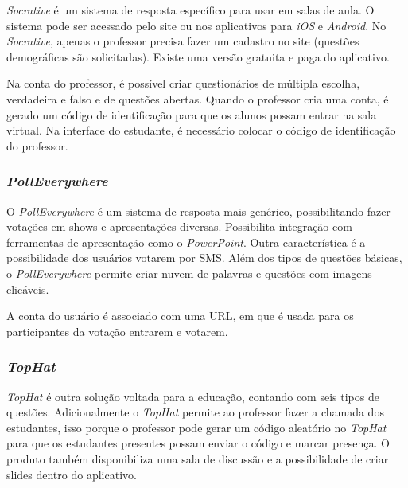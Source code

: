 \textit{Socrative} é um sistema de resposta específico para usar em salas de aula. O sistema pode ser
acessado pelo site ou nos aplicativos para \textit{iOS} e \textit{Android}. No \textit{Socrative}, apenas o professor
precisa fazer um cadastro no site (questões demográficas são solicitadas). Existe uma versão
gratuita e paga do aplicativo.

Na conta do professor, é possível criar questionários de múltipla escolha, verdadeira e falso e
de questões abertas. Quando o professor cria uma conta, é gerado um código de identificação
para que os alunos possam entrar na sala virtual. Na interface do estudante, é necessário
colocar o código de identificação do professor.

\subsubsection{\textit{PollEverywhere}}

O \textit{PollEverywhere} é um sistema de resposta mais genérico, possibilitando fazer votações em
shows e apresentações diversas. Possibilita integração com ferramentas de apresentação
como o \textit{PowerPoint}. Outra característica é a possibilidade dos usuários votarem por SMS.
Além dos tipos de questões básicas, o \textit{PollEverywhere} permite criar nuvem de palavras e
questões com imagens clicáveis.

A conta do usuário é associado com uma URL, em que é usada para os participantes
da votação entrarem e votarem.

\subsubsection{\textit{TopHat}}

\textit{TopHat} é outra solução voltada para a educação, contando com seis tipos de questões.
Adicionalmente o \textit{TopHat} permite ao professor fazer a chamada dos estudantes, isso porque
o professor pode gerar um código aleatório no \textit{TopHat} para que os estudantes presentes
possam enviar o código e marcar presença. O produto também disponibiliza uma sala
de discussão e a possibilidade de criar slides dentro do aplicativo.

